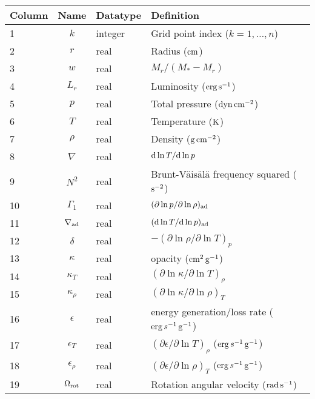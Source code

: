 \documentclass{article}
\newcommand{\diff}{\ensuremath{{\rm d}}}
\newcommand{\Mstar}{\ensuremath{M_{\ast}}}
\newcommand{\cm}{\ensuremath{{\rm cm}}}
\newcommand{\gram}{\ensuremath{{\rm g}}}
\newcommand{\second}{\ensuremath{{\rm s}}}
\newcommand{\dyne}{\ensuremath{{\rm dyn}}}
\newcommand{\erg}{\ensuremath{{\rm erg}}}
\newcommand{\kelvin}{\ensuremath{{\rm K}}}
\begin{document}
\begin{table}[h!]
\begin{tabular}{|l|c|l|l|} \hline
Column & Name & Datatype & Definition \\ \hline
1      & $k$ & integer & Grid point index ($k=1,\ldots,n$) \\
2      & $r$ & real    & Radius ($\cm$) \\
3      & $w$ & real    & $M_{r}/(\Mstar-M_{r})$ \\
4      & $L_{r}$ & real & Luminosity ($\erg\,\second^{-1}$) \\
5      & $p$ & real    & Total pressure ($\dyne\,\cm^{-2}$) \\
6      & $T$ & real    & Temperature ($\kelvin$) \\
7      & $\rho$ & real & Density ($\gram\,\cm^{-2}$) \\
8      & $\nabla$ & real & $\diff \ln T/\diff \ln p$ \\
9      & $N^{2}$ & real & Brunt-V\"ais\"al\"a frequency squared ($\second^{-2}$) \\
10     & $\Gamma_{1}$ & real & $(\partial \ln p/\partial \ln \rho)_{\rm ad}$ \\
11     & $\nabla_{\rm ad}$ & real & $(\diff \ln T/\diff \ln p)_{\rm ad}$ \\
12     & $\delta$ & real & $-(\partial \ln \rho/\partial \ln T)_{p}$  \\
13     & $\kappa$ & real & opacity ($\cm^{2}\,\gram^{-1}$) \\
14     & $\kappa_{T}$ & real & $(\partial \ln \kappa/\partial \ln T)_{\rho}$ \\
15     & $\kappa_{\rho}$ & real & $(\partial \ln \kappa/\partial \ln \rho)_{T}$ \\
16     & $\epsilon$ & real & energy generation/loss rate ($\erg\,s^{-1}\,\gram^{-1}$) \\
17     & $\epsilon_{T}$ & real & $(\partial \epsilon/\partial \ln T)_{\rho}$ ($\erg\,s^{-1}\,\gram^{-1}$) \\
18     & $\epsilon_{\rho}$ & real & $(\partial \epsilon/\partial \ln \rho)_{T}$ ($\erg\,s^{-1}\,\gram^{-1}$) \\
19     & $\Omega_{\rm rot}$ & real & Rotation angular velocity (${\rm rad}\,\second^{-1}$) \\  \hline
\end{tabular}
\end{table}
\end{document}
